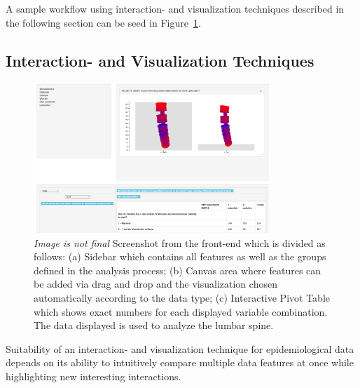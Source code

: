 \documentclass[journal]{style/vgtc} 			          %
\begin{document}
%
%
A sample workflow using interaction- and visualization techniques described in the following section can be seed in Figure~\ref{fig:visualization}.

\subsection{Interaction- and Visualization Techniques} \label{Interaction- and Visualization Techniques}
\begin{figure}[htb]
 \centering
 \includegraphics[width=3.5in]{figures/visualization}
 \caption{\emph{Image is not final} Screenshot from the front-end which is divided as follows: (a) Sidebar which contains all features as well as the groups defined in the analysis process; (b) Canvas area where features can be added via drag and drop and the visualization chosen automatically according to the data type; (c) Interactive Pivot Table which shows exact numbers for each displayed variable combination. The data displayed is used to analyze the lumbar spine.
 }
 \label{fig:visualization}
\end{figure}
%
%
Suitability of an interaction- and visualization technique for epidemiological data depends on its ability to intuitively compare multiple data features at once while highlighting new interesting interactions.
\end{document}
